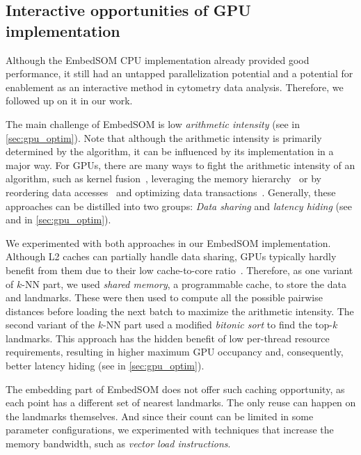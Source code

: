 \subsection{Interactive opportunities of GPU implementation}

Although the EmbedSOM CPU implementation already provided good performance, it still had an untapped parallelization potential and a potential for enablement as an interactive method in cytometry data analysis. Therefore, we followed up on it in our work. 

The main challenge of EmbedSOM is low \emph{arithmetic intensity} (see  in \cref{sec:gpu_optim}). Note that although the arithmetic intensity is primarily determined by the algorithm, it can be influenced by its implementation in a major way. For GPUs, there are many ways to fight the arithmetic intensity of an algorithm, such as kernel fusion~\cite{wahib2014scalable}, leveraging the memory hierarchy~\cite{lee2012cuda} or by reordering data accesses~\cite{ghysels2012improving} and optimizing data transactions~\cite{lu2020optimizing}. Generally, these approaches can be distilled into two groups: \emph{Data sharing} and \emph{latency hiding} (see  and  in \cref{sec:gpu_optim}).

We experimented with both approaches in our EmbedSOM implementation. Although L2 caches can partially handle data sharing, GPUs typically hardly benefit from them due to their low cache-to-core ratio~\cite{site:cuda}. Therefore, as one variant of $k$-NN part, we used \emph{shared memory}, a programmable cache, to store the data and landmarks. These were then used to compute all the possible pairwise distances before loading the next batch to maximize the arithmetic intensity. The second variant of the $k$-NN part used a modified \emph{bitonic sort} to find the top-$k$ landmarks. This approach has the hidden benefit of low per-thread resource requirements, resulting in higher maximum GPU occupancy and, consequently, better latency hiding  (see  in \cref{sec:gpu_optim}).

The embedding part of EmbedSOM does not offer such caching opportunity, as each point has a different set of nearest landmarks. The only reuse can happen on the landmarks themselves. And since their count can be limited in some parameter configurations, we experimented with techniques that increase the memory bandwidth, such as \emph{vector load instructions}. 

